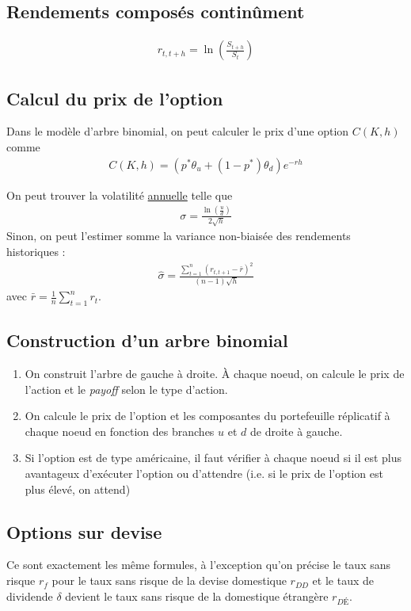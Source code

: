 \documentclass[10pt, french]{article}
\begin{document}
\begin{multicols*}{2}
\subsection*{Rendements composés continûment}
\begin{align*}
	r_{t,t+h} = \ln \left( \frac{S_{t+h}}{S_t} \right)
\end{align*}


\subsection*{Calcul du prix de l'option}
Dans le modèle d'arbre binomial, on peut calculer le prix d'une option $C(K,h)$ comme
\begin{align*}
	C(K,h) = (p^* \theta_u + (1-p^*)\theta_d) e^{-rh}
\end{align*}



On peut trouver la volatilité \underline{annuelle} telle que
\begin{align*}
	\sigma = \frac{\ln \left( \frac{u}{d} \right)}{2 \sqrt{h}}
\end{align*}
Sinon, on peut l'estimer somme la variance non-biaisée des rendements historiques :
\begin{align*}
	\hat{\sigma} = \frac{\sum_{t=1}^{n} (r_{t, t+1} - \bar{r})^2}{(n-1)\sqrt{h}}
\end{align*}
avec $\bar{r} = \frac{1}{n} \sum_{t=1}^n r_t$.

\subsection{Construction d'un arbre binomial}
\begin{enumerate}
	\item On construit l'arbre de gauche à droite. À chaque noeud, on calcule le prix de l'action et le \emph{payoff} selon le type d'action.
	\item On calcule le prix de l'option et les composantes du portefeuille réplicatif à chaque noeud en fonction des branches $u$ et $d$ de droite à gauche.
	\item Si l'option est de type américaine, il faut vérifier à chaque noeud si il est plus avantageux d'exécuter l'option ou d'attendre (i.e. si le prix de l'option est plus élevé, on attend)
\end{enumerate}


\subsection{Options sur devise}
Ce sont exactement les même formules, à l'exception qu'on précise le taux sans risque $r_f$ pour le taux sans risque de la devise domestique $r_{DD}$ et le taux de dividende $\delta$ devient le taux sans risque de la domestique étrangère $r_{DÉ}$.















\end{multicols*}

\end{document}
